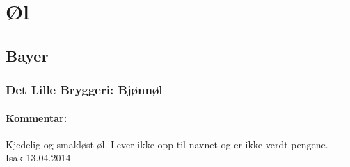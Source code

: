 \documentclass[12pt,a4paper,oneside,norsk]{article}
\begin{document}
    \thispagestyle{empty}
\newpage

\setcounter{page}{1}
\tableofcontents
\newpage

\section{Øl}
\subsection{Bayer}

\subsubsection{Det Lille Bryggeri: Bjønnøl}
\paragraph{Kommentar:}Kjedelig og smakløst øl. Lever ikke opp til navnet og er ikke verdt pengene.
\newline
-- -- Isak 13.04.2014
\end{document}
